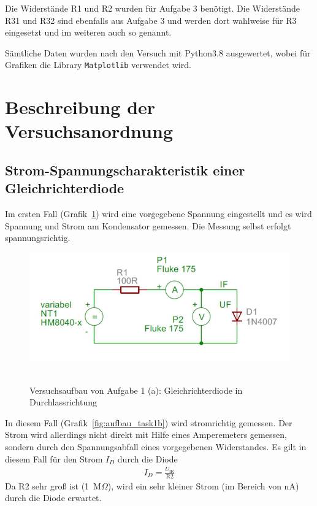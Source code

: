 \documentclass{article}
\begin{document}
Die Widerstände R1 und R2 wurden für Aufgabe 3 benötigt. Die Widerstände R31 und R32 sind ebenfalls aus Aufgabe 3 und werden dort wahlweise für R3 eingesetzt und im weiteren auch so genannt.


Sämtliche Daten wurden nach den Versuch mit Python3.8 ausgewertet, wobei für Grafiken die Library \texttt{Matplotlib} verwendet wird. 





\section{Beschreibung der Versuchsanordnung}

\subsection{Strom-Spannungscharakteristik einer Gleichrichterdiode}

Im ersten Fall (Grafik~\ref{fig:aufbau_task1a}) wird eine vorgegebene Spannung eingestellt und es wird Spannung und Strom am Kondensator gemessen. Die Messung selbst erfolgt spannungsrichtig.

\begin{figure}[H]
\caption{Versuchsaufbau von Aufgabe 1 (a): Gleichrichterdiode in Durchlassrichtung}
\label{fig:aufbau_task1a}
{\centering
\includegraphics[scale=1.7]{bilder/aufbau_task1a.png}
~
}
\end{figure}


In diesem Fall (Grafik~\ref{fig:aufbau_task1b}) wird stromrichtig gemessen. Der Strom wird allerdings nicht direkt mit Hilfe eines Amperemeters gemessen, sondern durch den Spannungsabfall eines vorgegebenen Widerstandes. Es gilt in diesem Fall für den Strom $I_D$ durch die Diode
\begin{align*}
I_D = \frac{U_\text{IR}}{\text{R2}}
\end{align*}
Da R2 sehr groß ist (1~M$\Omega$), wird ein sehr kleiner Strom (im Bereich von nA) durch die Diode erwartet.
\end{document}
